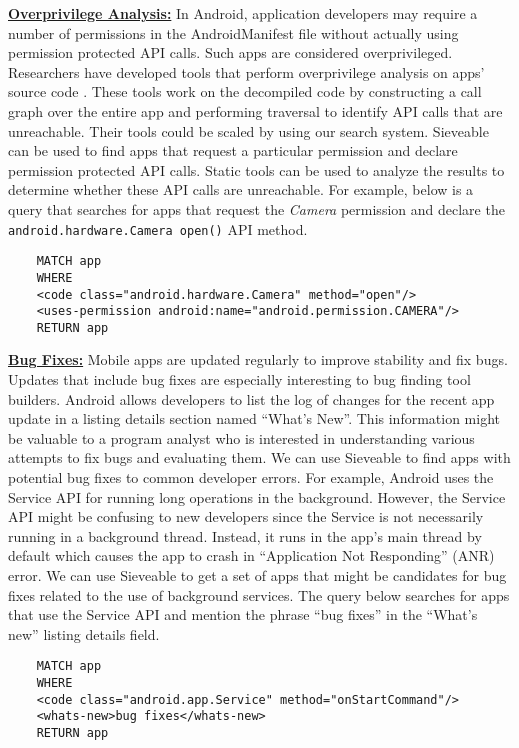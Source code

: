 \underline{\textbf{Overprivilege Analysis:}}
In Android, application developers may require a number of permissions in the AndroidManifest file without actually using permission protected API calls. Such apps are considered overprivileged. 
Researchers have developed tools that perform overprivilege analysis on apps' source code \cite{felt2011android,au2012pscout}.
These tools work on the decompiled code by constructing a call graph over the entire app and performing traversal to identify API calls that are unreachable.
Their tools could be scaled by using our search system. 
Sieveable can be used to find apps that request a particular permission and declare permission protected API calls.
Static tools can be used to analyze the results to determine whether these API calls are unreachable.
For example, below is a query that searches for apps that request the \textit{Camera} permission and declare the \texttt{android.hardware.Camera open()} API method.

\begin{verbatim}
	MATCH app
	WHERE
	<code class="android.hardware.Camera" method="open"/>
	<uses-permission android:name="android.permission.CAMERA"/>
	RETURN app
\end{verbatim}

\underline{\textbf{{Bug Fixes:}}}
Mobile apps are updated regularly to improve stability and fix bugs.
Updates that include bug fixes are especially interesting to bug finding tool builders.
Android allows developers to list the log of changes for the recent app update in a listing details section named ``What's New''.
This information might be valuable to a program analyst who is interested in understanding various attempts to fix bugs and evaluating them.
We can use Sieveable to find apps with potential bug fixes to common developer errors.
For example, Android uses the Service API for running long operations in the background.
However, the Service API might be confusing to new developers since the Service is not necessarily running in a background thread.
Instead, it runs in the app's main thread by default which causes the app to crash in ``Application Not Responding'' (ANR) error.
We can use Sieveable to get a set of apps that might be candidates for bug fixes related to the use of background services. The query below searches for apps that use the Service API and mention the phrase ``bug fixes'' in the ``What's new'' listing details field.

\begin{verbatim}
	MATCH app
	WHERE
	<code class="android.app.Service" method="onStartCommand"/>
	<whats-new>bug fixes</whats-new> 
	RETURN app
\end{verbatim}

